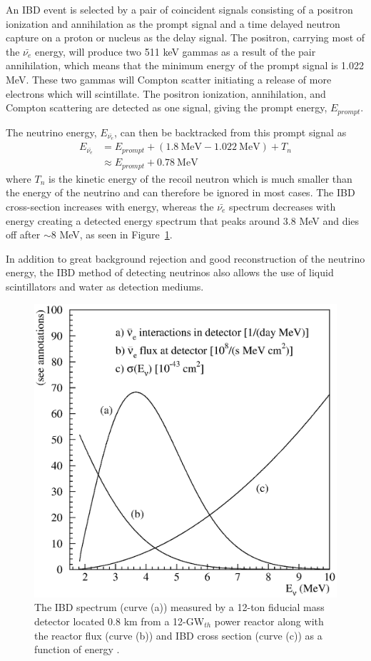 An IBD event is selected by a pair of coincident signals consisting of a positron ionization and annihilation as the prompt signal and a time delayed neutron capture on a proton or nucleus as the delay signal. 
The positron, carrying most of the $\bar{\nu_{e}}$ energy, will produce two 511 keV gammas as a result of the pair annihilation, which means that the minimum energy of the prompt signal is 1.022 MeV.
These two gammas will Compton scatter initiating a release of more electrons which will scintillate.
The positron ionization, annihilation, and Compton scattering are detected as one signal, giving the prompt energy, $E_{prompt}$.

The neutrino energy, $E_{\bar{\nu_{e}}}$, can then be backtracked from this prompt signal as 
\begin{equation}
\begin{split}
	E_{\bar{\nu_{e}}} &= E_{prompt} + (1.8~\textrm{MeV} - 1.022~\textrm{MeV}) + T_n \\
			&\approx E_{prompt} + 0.78~\textrm{MeV}
\end{split}
\end{equation}
where $T_n$ is the kinetic energy of the recoil neutron which is much smaller than the energy of the neutrino and can therefore be ignored in most cases. 
The IBD cross-section increases with energy, whereas the $\bar{\nu_{e}}$ spectrum decreases with energy creating a detected energy spectrum that peaks around 3.8 MeV and dies off after $\sim$8 MeV, as seen in Figure~\ref{fig:vogel-fig02}. 

In addition to great background rejection and good reconstruction of the neutrino energy, the IBD method of detecting neutrinos also allows the use of liquid scintillators and water as detection mediums. 

\begin{figure}[h]
	\centering
	\includegraphics[width=0.55\linewidth]{tex/3-reactorneutrinos-images/vogel-fig02}
	\caption[The IBD spectrum.]{The IBD spectrum (curve (a)) measured by a 12-ton fiducial mass detector located 0.8 km from a 12-GW$_{th}$ power reactor along with the reactor flux (curve (b)) and IBD cross section (curve (c)) as a function of energy \cite{PDG}.}
	\label{fig:vogel-fig02}
\end{figure}



